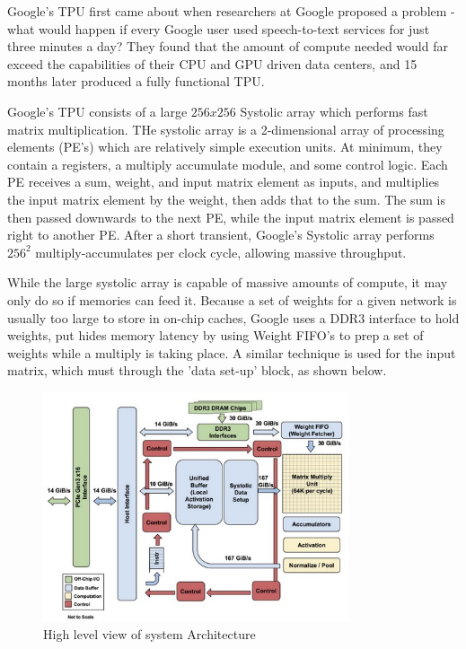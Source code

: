 \documentclass[11pt, conference, onecolumn]{IEEEtran}
\begin{document}
    Google's TPU first came about when researchers at Google proposed a problem - what
    would happen if every Google user used speech-to-text services for just three minutes
    a day? They found that the amount of compute needed would far exceed the capabilities
    of their CPU and GPU driven data centers, and 15 months later produced a fully
    functional TPU.

    Google's TPU consists of a large $256 x 256$ Systolic array which performs fast matrix
    multiplication. THe systolic array is a 2-dimensional array of processing elements
    (PE's) which are relatively simple execution units. At minimum, they contain a
    registers, a multiply accumulate module, and some control logic. Each PE receives a
    sum, weight, and input matrix element as inputs, and multiplies the input matrix
    element by the weight, then adds that to the sum. The sum is then passed downwards
    to the next PE, while the input matrix element is passed right to another PE. After
    a short transient, Google's Systolic array performs $256^2$ multiply-accumulates per
    clock cycle, allowing massive throughput.

    While the large systolic array is capable of massive amounts of compute, it may only
    do so if memories can feed it. Because a set of weights for a given network is usually
    too large to store in on-chip caches, Google uses a DDR3 interface to hold weights,
    put hides memory latency by using Weight FIFO's to prep a set of weights while a
    multiply is taking place. A similar technique is used for the input matrix, which must
    through the 'data set-up' block, as shown below.

    \newpage

    \begin{figure}[htbp]
        \centering
        \includegraphics[width=9cm]{../figures/googleArchitecture.jpg}
        \caption{High level view of system Architecture}
    \end{figure}
\end{document}
